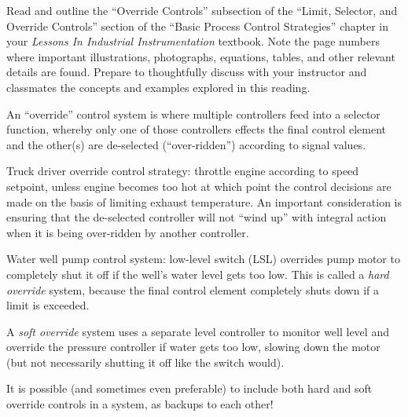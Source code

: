 

Read and outline the ``Override Controls'' subsection of the ``Limit, Selector, and Override Controls'' section of the ``Basic Process Control Strategies'' chapter in your {\it Lessons In Industrial Instrumentation} textbook.  Note the page numbers where important illustrations, photographs, equations, tables, and other relevant details are found.  Prepare to thoughtfully discuss with your instructor and classmates the concepts and examples explored in this reading.














An ``override'' control system is where multiple controllers feed into a selector function, whereby only one of those controllers effects the final control element and the other(s) are de-selected (``over-ridden'') according to signal values.

\vskip 10pt

Truck driver override control strategy: throttle engine according to speed setpoint, unless engine becomes too hot at which point the control decisions are made on the basis of limiting exhaust temperature.  An important consideration is ensuring that the de-selected controller will not ``wind up'' with integral action when it is being over-ridden by another controller.

\vskip 10pt

Water well pump control system: low-level switch (LSL) overrides pump motor to completely shut it off if the well's water level gets too low.  This is called a {\it hard override} system, because the final control element completely shuts down if a limit is exceeded.

A {\it soft override} system uses a separate level controller to monitor well level and override the pressure controller if water gets too low, slowing down the motor (but not necessarily shutting it off like the switch would).

It is possible (and sometimes even preferable) to include both hard and soft override controls in a system, as backups to each other!

